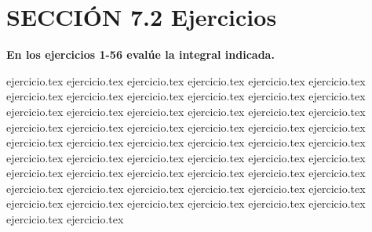 
\section*{SECCIÓN 7.2 \quad Ejercicios}

\noindent\textbf{En los ejercicios 1-56 evalúe la integral indicada.}
\begin{enumerate}
    {ejercicio.tex}
{ejercicio.tex}
{ejercicio.tex}
{ejercicio.tex}
{ejercicio.tex}
{ejercicio.tex}
{ejercicio.tex}
{ejercicio.tex}
{ejercicio.tex}
{ejercicio.tex}
{ejercicio.tex}
{ejercicio.tex}
{ejercicio.tex}
{ejercicio.tex}
{ejercicio.tex}
{ejercicio.tex}
{ejercicio.tex}
{ejercicio.tex}
{ejercicio.tex}
{ejercicio.tex}
{ejercicio.tex}
{ejercicio.tex}
{ejercicio.tex}
{ejercicio.tex}
{ejercicio.tex}
{ejercicio.tex}
{ejercicio.tex}
{ejercicio.tex}
{ejercicio.tex}
{ejercicio.tex}
{ejercicio.tex}
{ejercicio.tex}
{ejercicio.tex}
{ejercicio.tex}
{ejercicio.tex}
{ejercicio.tex}
{ejercicio.tex}
{ejercicio.tex}
{ejercicio.tex}
{ejercicio.tex}
{ejercicio.tex}
{ejercicio.tex}
{ejercicio.tex}
{ejercicio.tex}
{ejercicio.tex}
{ejercicio.tex}
{ejercicio.tex}
{ejercicio.tex}
{ejercicio.tex}
{ejercicio.tex}
{ejercicio.tex}
{ejercicio.tex}
{ejercicio.tex}
{ejercicio.tex}
{ejercicio.tex}
{ejercicio.tex}
\end{enumerate}

